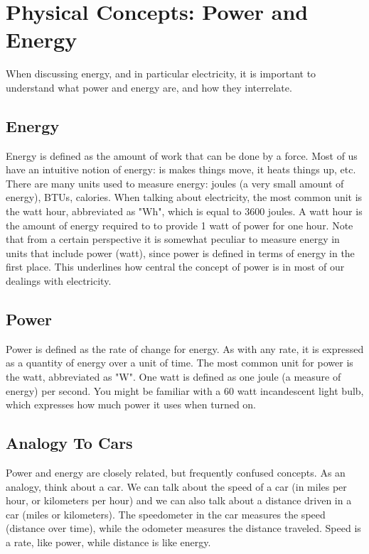 \chapter{Physical Concepts: Power and Energy}
\label{app:power-energy}

When discussing energy, and in particular electricity, it is important to understand what power and energy are, and how they interrelate.

\section{Energy}

Energy is defined as the amount of work that can be done by a force. Most of us have an intuitive notion of energy: is makes things move, it heats things up, etc. There are many units used to measure energy: joules (a very small amount of energy), BTUs, calories. When talking about electricity, the most common unit is the watt hour, abbreviated as "Wh", which is equal to 3600 joules. A watt hour is the amount of energy required to to provide 1 watt of power for one hour. Note that from a certain perspective it is somewhat peculiar to measure energy in units that include power (watt), since power is defined in terms of energy in the first place. This underlines how central the concept of power is in most of our dealings with electricity.

\section{Power}

Power is defined as the rate of change for energy. As with any rate, it is expressed as a quantity of energy over a unit of time. The most common unit for power is the watt, abbreviated as "W". One watt is defined as one joule (a measure of energy) per second. You might be familiar with a 60 watt incandescent light bulb, which expresses how much power it uses when turned on.

\section{Analogy To Cars}

Power and energy are closely related, but frequently confused concepts. As an analogy, think about a car. We can talk about the speed of a car (in miles per hour, or kilometers per hour) and we can also talk about a distance driven in a car (miles or kilometers). The speedometer in the car measures the speed (distance over time), while the odometer measures the distance traveled. Speed is a rate, like power, while distance is like energy.


